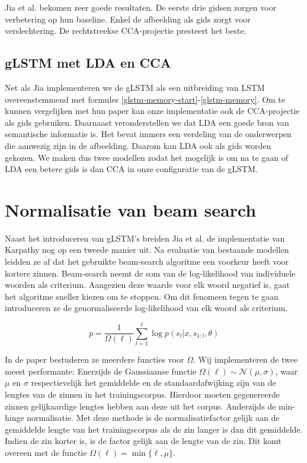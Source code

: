 Jia et al. bekomen zeer goede resultaten. De eerste drie gidsen zorgen voor verbetering op hun baseline. Enkel de afbeelding als gids zorgt voor verslechtering. De rechtstreekse CCA-projectie presteert het beste.

\subsection{gLSTM met LDA en CCA}
Net als Jia implementeren we de gLSTM als een uitbreiding van LSTM overeenstemmend met formules \ref{glstm-memory-start}-\ref{glstm-memory}.
Om te kunnen vergelijken met hun paper kan onze implementatie ook de CCA-projectie als gids gebruiken.
Daarnaast veronderstellen we dat LDA een goede bron van semantische informatie is. Het bevat immers een verdeling van de onderwerpen die aanwezig zijn in de afbeelding. Daarom kan LDA ook als gids worden gekozen.
We maken dus twee modellen zodat het mogelijk is om na te gaan of LDA een betere gids is dan CCA in onze configuratie van de gLSTM.

\section{Normalisatie van beam search}
Naast het introduceren van gLSTM's breiden Jia et al.  de implementatie van Karpathy nog op een tweede manier uit. Na evaluatie van bestaande modellen leidden ze af dat het gebruikte beam-search algoritme een voorkeur heeft voor kortere zinnen. Beam-search neemt de som van de log-likelihood van individuele woorden als criterium. Aangezien deze waarde voor elk woord negatief is, gaat het algoritme sneller kiezen om te stoppen. Om dit fenomeen tegen te gaan introduceren ze de genormaliseerde log-likelihood van elk woord als criterium.

\begin{equation}
p = \frac{1}{\Omega(\ell)}\sum_{l=1}^{\ell} \log p(s_l | x, s_{1:l}, \theta)
\label{eq:log-sentence-norm}
\end{equation}

In de paper bestuderen ze meerdere functies voor $\Omega$. Wij implementeren de twee meest performante:
Enerzijds de Gaussiaanse functie $\Omega(\ell) \sim \mathcal{N}(\mu, \sigma)$, waar $\mu$ en $\sigma$ respectievelijk het gemiddelde en de standaardafwijking zijn van de lengtes van de zinnen in het trainingscorpus. Hierdoor moeten gegenereerde zinnen gelijkaardige lengtes hebben aan deze uit het corpus.
Anderzijds de min-hinge normalisatie. Met deze methode is de normalisatiefactor gelijk aan de gemiddelde lengte van het trainingscorpus als de zin langer is dan dit gemiddelde. Indien de zin korter is, is de factor gelijk aan de lengte van de zin. Dit komt overeen met de functie $\Omega(\ell)=\min\{\ell, \mu\}$.
